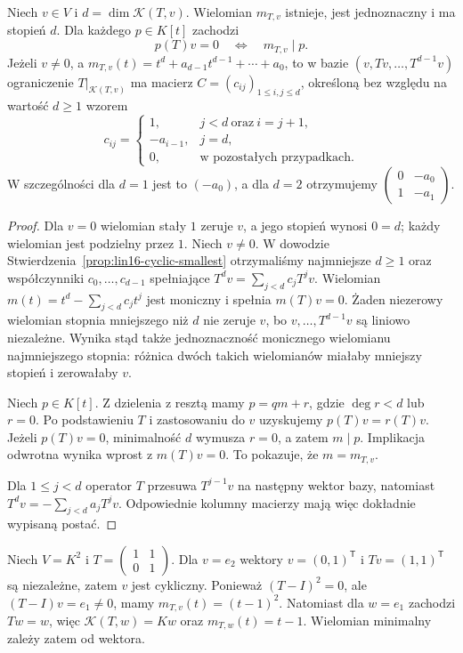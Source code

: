 \begin{twierdzenie}
\label{thm:lin16-vector-minpoly}
Niech \(v\in V\) i
\(d=\dim\mathcal K(T,v)\).
Wielomian \(m_{T,v}\) istnieje, jest jednoznaczny
i ma stopień \(d\).
Dla każdego \(p\in K[t]\) zachodzi
\[
 p(T)v=0\quad\Longleftrightarrow\quad
 m_{T,v}\mid p.
\]
Jeżeli \(v\ne0\), a
\(m_{T,v}(t)=t^d+a_{d-1}t^{d-1}+\cdots+a_0\),
to w bazie \((v,Tv,\ldots,T^{d-1}v)\)
ograniczenie \(T|_{\mathcal K(T,v)}\)
ma macierz \(C=(c_{ij})_{1\le i,j\le d}\),
określoną bez względu na wartość \(d\ge1\) wzorem
\[
 c_{ij}=
 \begin{cases}
  1,& j<d\ \text{oraz}\ i=j+1,\\
  -a_{i-1},& j=d,\\
  0,& \text{w pozostałych przypadkach}.
 \end{cases}
\]
W szczególności dla \(d=1\) jest to
\((-a_0)\), a dla \(d=2\) otrzymujemy
\(\begin{pmatrix}0&-a_0\\1&-a_1\end{pmatrix}\).
\end{twierdzenie}
\begin{proof}
Dla \(v=0\) wielomian stały \(1\)
zeruje \(v\), a jego stopień wynosi \(0=d\);
każdy wielomian jest podzielny przez \(1\).
Niech \(v\ne0\).
W dowodzie Stwierdzenia~\ref{prop:lin16-cyclic-smallest}
otrzymaliśmy najmniejsze \(d\ge1\)
oraz współczynniki \(c_0,\ldots,c_{d-1}\)
spełniające \(T^dv=\sum_{j<d}c_jT^jv\).
Wielomian
\(m(t)=t^d-\sum_{j<d}c_jt^j\)
jest moniczny i spełnia \(m(T)v=0\).
Żaden niezerowy wielomian stopnia mniejszego
niż \(d\) nie zeruje \(v\),
bo \(v,\ldots,T^{d-1}v\) są liniowo niezależne.
Wynika stąd także jednoznaczność
monicznego wielomianu najmniejszego stopnia:
różnica dwóch takich wielomianów
miałaby mniejszy stopień i zerowałaby \(v\).

Niech \(p\in K[t]\).
Z dzielenia z resztą mamy
\(p=qm+r\), gdzie \(\deg r<d\) lub \(r=0\).
Po podstawieniu \(T\) i zastosowaniu do \(v\)
uzyskujemy \(p(T)v=r(T)v\).
Jeżeli \(p(T)v=0\), minimalność \(d\)
wymusza \(r=0\), a zatem \(m\mid p\).
Implikacja odwrotna wynika wprost z \(m(T)v=0\).
To pokazuje, że \(m=m_{T,v}\).

Dla \(1\le j<d\) operator \(T\) przesuwa
\(T^{j-1}v\) na następny wektor bazy,
natomiast \(T^dv=-\sum_{j<d}a_jT^jv\).
Odpowiednie kolumny macierzy
mają więc dokładnie wypisaną postać.
\end{proof}

\begin{przyklad}
\label{prz:lin16-jordan-cyclic}
Niech \(V=K^2\) i
\(T=\begin{pmatrix}1&1\\0&1\end{pmatrix}\).
Dla \(v=e_2\) wektory
\(v=(0,1)^{\mathsf T}\) i
\(Tv=(1,1)^{\mathsf T}\) są niezależne,
zatem \(v\) jest cykliczny.
Ponieważ \((T-I)^2=0\), ale
\((T-I)v=e_1\ne0\),
mamy \(m_{T,v}(t)=(t-1)^2\).
Natomiast dla \(w=e_1\)
zachodzi \(Tw=w\), więc
\(\mathcal K(T,w)=Kw\) oraz
\(m_{T,w}(t)=t-1\).
Wielomian minimalny zależy zatem od wektora.
\end{przyklad}

